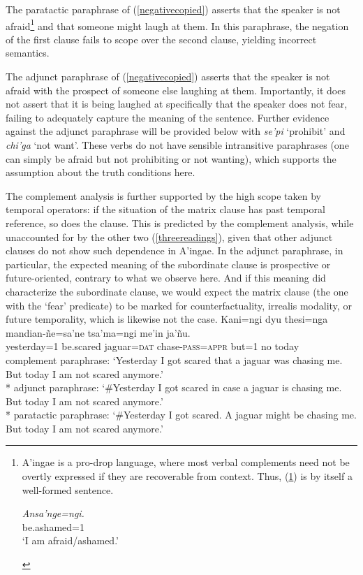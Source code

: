 \documentclass[output=paper,colorlinks,citecolor=brown]{langscibook}
\begin{document}
The paratactic paraphrase of (\ref{negativecopied}) asserts that the speaker is not afraid\footnote{A'ingae is a pro-drop language, where most verbal complements need not be overtly expressed if they are recoverable from context. Thus, (\ref{ex:i_am}) is by itself a well-formed sentence.
    \begin{exe}
        \ex \label{ex:i_am}
        \gll \textit{Ansa'nge=ngi.}  \\
        {be.ashamed=\textsc{1}} \\
        \glt `I am afraid/ashamed.'
    \end{exe}}
and that someone might laugh at them. In this paraphrase, the negation of the first clause fails to scope over the second clause, yielding incorrect semantics.

The adjunct paraphrase of (\ref{negativecopied}) asserts that the speaker is not afraid with the prospect of someone else laughing at them. Importantly, it does not assert that it is being laughed at specifically that the speaker does not fear, failing to adequately capture the meaning of the sentence. Further evidence against the adjunct paraphrase will be provided below with \textit{se'pi} `prohibit' and \textit{chi'ga} `not want'. These verbs do not have sensible intransitive paraphrases (one can simply be afraid but not prohibiting or not wanting), which supports the assumption about the truth conditions here.



\iffalse
    
The complement analysis is further supported by the high scope taken by temporal operators: if the situation of the matrix clause has past temporal reference, so does the  clause. This is predicted by the complement analysis, while unaccounted for by the other two (\ref{threereadings}), given that other adjunct clauses do not show such dependence in A'ingae. In the adjunct paraphrase, in particular, the expected meaning of the subordinate  clause is prospective or future-oriented, contrary to what we observe here. And if this meaning did characterize the subordinate  clause, we would expect the matrix clause (\ie the one with the `fear' predicate) to be marked for counterfactuality, irrealis modality, or future temporality, which is likewise not the case.
    \ea \label{threereadings}
    \gll Kani=ngi dyu {\ob}thesi=nga {mandian-ñe=sa'ne{\cb}} tsa'ma=ngi me'in {ja'ñu.} \\
         yesterday\textsc{=}1 {be.scared} jaguar=\textsc{dat} chase-\textsc{pass=appr} but\textsc{=}1 no {today}  \\
    \glt complement paraphrase: `Yesterday I got scared that a jaguar was chasing me. But today I am not scared anymore.' \\*
         adjunct paraphrase: `\#Yesterday I got scared in case a jaguar is chasing me. But today I am not scared anymore.' \\*
         paratactic paraphrase: `\#Yesterday I got scared. A jaguar might be chasing me. But today I am not scared anymore.'
    \z 
    
\end{document}
